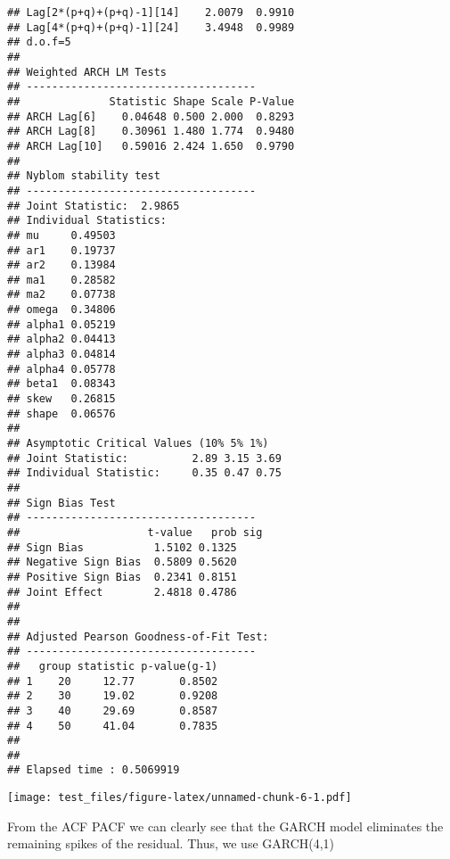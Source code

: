 \documentclass[]{article}
\newenvironment{Shaded}{\begin{snugshade}}{\end{snugshade}}
\newcommand{\KeywordTok}[1]{\textcolor[rgb]{0.13,0.29,0.53}{\textbf{#1}}}
\newcommand{\DataTypeTok}[1]{\textcolor[rgb]{0.13,0.29,0.53}{#1}}
\newcommand{\StringTok}[1]{\textcolor[rgb]{0.31,0.60,0.02}{#1}}
\newcommand{\CommentTok}[1]{\textcolor[rgb]{0.56,0.35,0.01}{\textit{#1}}}
\newcommand{\OperatorTok}[1]{\textcolor[rgb]{0.81,0.36,0.00}{\textbf{#1}}}
\newcommand{\NormalTok}[1]{#1}
\begin{document}
\begin{verbatim}
## Lag[2*(p+q)+(p+q)-1][14]    2.0079  0.9910
## Lag[4*(p+q)+(p+q)-1][24]    3.4948  0.9989
## d.o.f=5
## 
## Weighted ARCH LM Tests
## ------------------------------------
##              Statistic Shape Scale P-Value
## ARCH Lag[6]    0.04648 0.500 2.000  0.8293
## ARCH Lag[8]    0.30961 1.480 1.774  0.9480
## ARCH Lag[10]   0.59016 2.424 1.650  0.9790
## 
## Nyblom stability test
## ------------------------------------
## Joint Statistic:  2.9865
## Individual Statistics:              
## mu     0.49503
## ar1    0.19737
## ar2    0.13984
## ma1    0.28582
## ma2    0.07738
## omega  0.34806
## alpha1 0.05219
## alpha2 0.04413
## alpha3 0.04814
## alpha4 0.05778
## beta1  0.08343
## skew   0.26815
## shape  0.06576
## 
## Asymptotic Critical Values (10% 5% 1%)
## Joint Statistic:          2.89 3.15 3.69
## Individual Statistic:     0.35 0.47 0.75
## 
## Sign Bias Test
## ------------------------------------
##                    t-value   prob sig
## Sign Bias           1.5102 0.1325    
## Negative Sign Bias  0.5809 0.5620    
## Positive Sign Bias  0.2341 0.8151    
## Joint Effect        2.4818 0.4786    
## 
## 
## Adjusted Pearson Goodness-of-Fit Test:
## ------------------------------------
##   group statistic p-value(g-1)
## 1    20     12.77       0.8502
## 2    30     19.02       0.9208
## 3    40     29.69       0.8587
## 4    50     41.04       0.7835
## 
## 
## Elapsed time : 0.5069919
\end{verbatim}

\begin{Shaded}
\end{Shaded}

\texttt{[image: test\_files/figure-latex/unnamed-chunk-6-1.pdf]}

From the ACF PACF we can clearly see that the GARCH model eliminates the
remaining spikes of the residual. Thus, we use GARCH(4,1)
\end{document}
